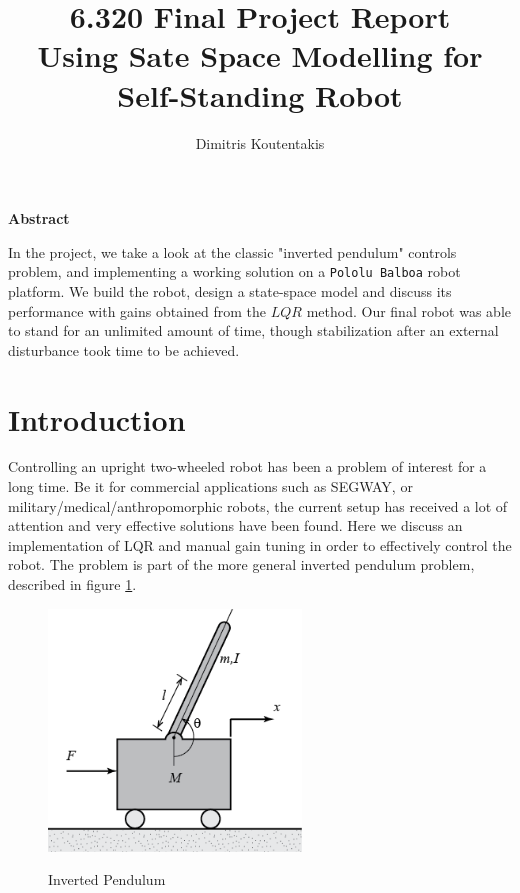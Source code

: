 \documentclass{article}
\begin{document}
\title{ 6.320 Final Project Report \\ 
Using Sate Space Modelling for Self-Standing Robot}
\author{Dimitris Koutentakis}
\date{}
\maketitle


\vspace{5mm}
\textbf{Abstract}
\vspace{2mm}

In the project, we take a look at the classic "inverted pendulum" controls problem, and implementing a working solution on a \texttt{Pololu Balboa} robot platform. We build the robot, design a state-space model and discuss its performance with gains obtained from the $LQR$ method. Our final robot was able to stand for an unlimited amount of time, though stabilization after an external disturbance took time to be achieved.

\section{Introduction}

Controlling an upright two-wheeled robot has been a problem of interest for a long time. Be it for commercial applications such as SEGWAY, or military/medical/anthropomorphic robots, the current setup has received a lot of attention and very effective solutions have been found. Here we discuss an implementation of LQR and manual gain tuning in order to effectively control the robot.
The problem is part of the more general inverted pendulum problem, described in figure \ref{pendulum}.

\begin{figure}[H]
    \caption{Inverted Pendulum}
    \centering
    \includegraphics[width=0.6\textwidth]{pendulum.png}
    \label{pendulum}
\end{figure}
    
\end{document}

